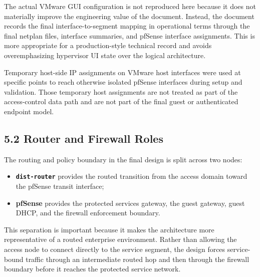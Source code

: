 \documentclass[11pt]{article}
\begin{document}
The actual VMware GUI configuration is not reproduced here because it does not materially improve the engineering value of the document. Instead, the document records the final interface-to-segment mapping in operational terms through the final netplan files, interface summaries, and pfSense interface assignments. This is more appropriate for a production-style technical record and avoids overemphasizing hypervisor UI state over the logical architecture.

Temporary host-side IP assignments on VMware host interfaces were used at specific points to reach otherwise isolated pfSense interfaces during setup and validation. Those temporary host assignments are not treated as part of the access-control data path and are not part of the final guest or authenticated endpoint model.


\subsection{5.2 Router and Firewall Roles}
\label{sec:router-and-firewall-roles}

The routing and policy boundary in the final design is split across two nodes:

\begin{itemize}
    \item \textbf{\texttt{dist-router}} provides the routed transition from the access domain toward the pfSense transit interface;
    \item \textbf{pfSense} provides the protected services gateway, the guest gateway, guest DHCP, and the firewall enforcement boundary.
\end{itemize}

This separation is important because it makes the architecture more representative of a routed enterprise environment. Rather than allowing the access node to connect directly to the service segment, the design forces service-bound traffic through an intermediate routed hop and then through the firewall boundary before it reaches the protected service network.
\end{document}
